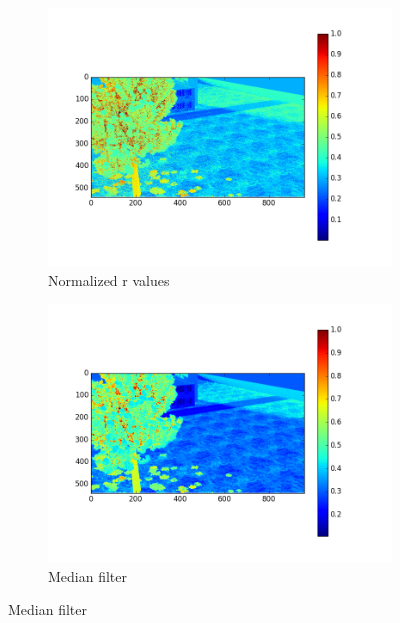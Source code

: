 \documentclass[fleqn,10pt]{SelfArx} %
\begin{document}
\begin{figure}
        \begin{subfigure}[b]{0.5\textwidth}
                \includegraphics[width=\linewidth]{Figures/ColorFigures/res1.png}
                \caption{Normalized r values}
                \label{fig:NormrColIm}
        \end{subfigure}%
        \begin{subfigure}[b]{0.5\textwidth}
                \includegraphics[width=\linewidth]{Figures/ColorFigures/res2.png}
                \caption{Median filter}
                \label{fig:MedFIlColIm}
        \end{subfigure}%
        

\end{figure}
\end{document}
